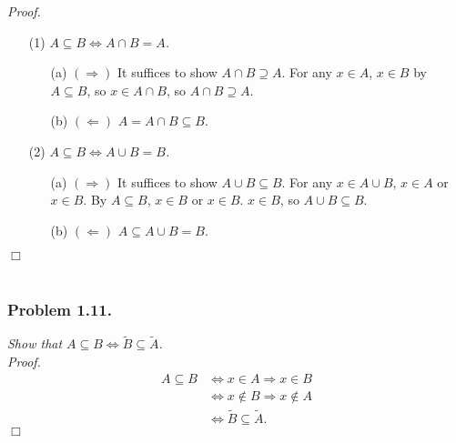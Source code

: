 \documentclass{article}
\begin{document}
\emph{Proof.}
\begin{enumerate}
\item[(1)]
\emph{$A \subseteq B \Longleftrightarrow A \cap B = A$.}
  \begin{enumerate}
  \item[(a)]
  \emph{$(\Longrightarrow)$}
  It suffices to show $A \cap B \supseteq A$.
  For any $x \in A$, $x \in B$ by $A \subseteq B$, so $x \in A \cap B$,
  so $A \cap B \supseteq A$.
  \item[(b)]
  \emph{$(\Longleftarrow)$}
  $A = A \cap B \subseteq B$.
  \end{enumerate}
\item[(2)]
\emph{$A \subseteq B \Leftrightarrow A \cup B = B$.}
  \begin{enumerate}
  \item[(a)]
  \emph{$(\Longrightarrow)$}
  It suffices to show $A \cup B \subseteq B$.
  For any $x \in A \cup B$, $x \in A$ or $x \in B$.
  By $A \subseteq B$, $x \in B$ or $x \in B$. $x \in B$,
  so $A \cup B \subseteq B$.
  \item[(b)]
  \emph{$(\Longleftarrow)$}
  $A \subseteq A \cup B = B$.
  \end{enumerate}
\end{enumerate}
$\Box$ \\\\






\subsubsection*{Problem 1.11.}
\emph{Show that
$A \subseteq B \Leftrightarrow \widetilde{B} \subseteq \widetilde{A}$.} \\

\emph{Proof.}
\begin{align*}
A \subseteq B
& \Longleftrightarrow
x \in A \Rightarrow x \in B \\
& \Longleftrightarrow
x \not\in B \Rightarrow x \not\in A \\
& \Longleftrightarrow
\widetilde{B} \subseteq \widetilde{A}.
\end{align*}
$\Box$ \\\\
\end{document}
